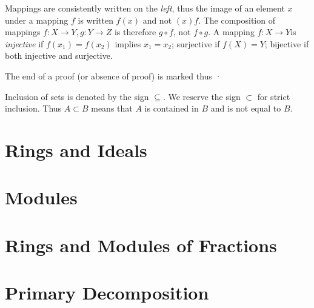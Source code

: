 \documentclass{book}
\theoremstyle{definition}
\theoremstyle{remark}
\begin{document}
Mappings are consistently written on the \textit{left}, thus the image of an element $x$
under a mapping $f$ is written $f(x)$ and not $(x)f$. The composition of mappings
$f: X\to Y, g: Y\to Z$ is therefore $g\circ f$, not $f\circ g$.
A mapping $f: X\to Y$is \textit{injective} if $f(x_1) = f(x_2)$ implies $x_1 =
x_2$; surjective if $f(X) = Y$; bijective if both injective and surjective.

The end of a proof (or absence of proof) is marked thus \qedsymbol·
\newline

Inclusion of sets is denoted by the sign $\subseteq$. We reserve the sign
$\subset$ for strict inclusion. Thus $A\subset B$ means that $A$ is contained in $B$ and is not equal to $B$.
\mainmatter
\chapter{Rings and Ideals}
\chapter{Modules}
\chapter{Rings and Modules of Fractions}
\chapter{Primary Decomposition}

\end{document}
